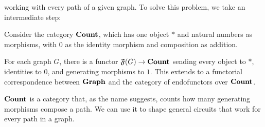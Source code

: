 \documentclass[preliminary,copyright,creativecommons,sharealike,noncommercial]{eptcs}
\begin{document}
working with every path of a given graph. To solve this problem, we take 
an intermediate step:
%
%
\begin{lemma}\label{lem: functor to count}
  Consider the category $\textbf{Count}$, which has one object $*$ and 
  natural numbers as morphisms, with $0$ as the identity morphism 
  and composition as addition. 

  For each graph $G$, there is a functor $\mathfrak{F}(G) \to \textbf{Count}$ sending 
  every object to  $*$, identities to $0$, and generating morphisms to $1$.
  This extends to a functorial correspondence between $\textbf{Graph}$ and the 
  category of endofunctors over $\textbf{Count}$.
\end{lemma}
%
$\textbf{Count}$ is a category that, as the name suggests, counts how many 
generating morphisms compose a path. We can use it to shape general 
circuits that work for every path in a graph.
%
%
\end{document}
